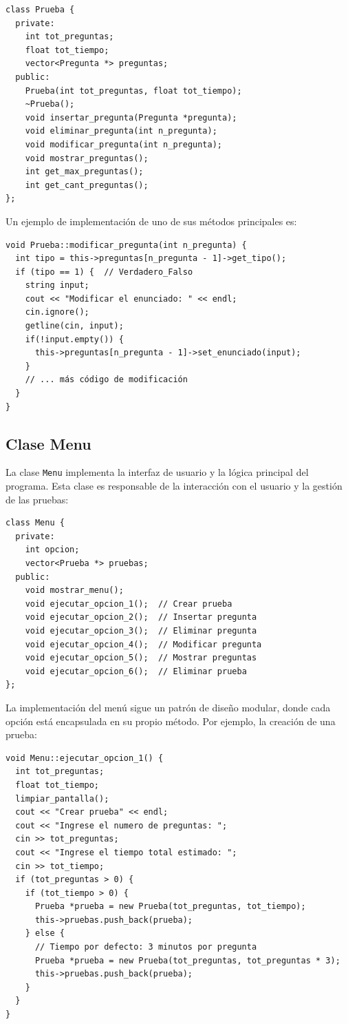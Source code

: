 \documentclass[12pt]{article}
\begin{document}
\begin{lstlisting}[style=customc]
class Prueba {
  private:
    int tot_preguntas;
    float tot_tiempo;
    vector<Pregunta *> preguntas;
  public:
    Prueba(int tot_preguntas, float tot_tiempo);
    ~Prueba();
    void insertar_pregunta(Pregunta *pregunta);
    void eliminar_pregunta(int n_pregunta);
    void modificar_pregunta(int n_pregunta);
    void mostrar_preguntas();
    int get_max_preguntas();
    int get_cant_preguntas();
};
\end{lstlisting}

Un ejemplo de implementaci\'on de uno de sus m\'etodos principales es:

\begin{lstlisting}[style=customc]
void Prueba::modificar_pregunta(int n_pregunta) {
  int tipo = this->preguntas[n_pregunta - 1]->get_tipo();
  if (tipo == 1) {  // Verdadero_Falso
    string input;
    cout << "Modificar el enunciado: " << endl;
    cin.ignore();
    getline(cin, input);
    if(!input.empty()) {
      this->preguntas[n_pregunta - 1]->set_enunciado(input);
    }
    // ... más código de modificación
  }
}
\end{lstlisting}

\subsection{Clase Menu}
La clase \texttt{Menu} implementa la interfaz de usuario y la l\'ogica principal del programa. Esta clase es responsable de la interacci\'on con el usuario y la gesti\'on de las pruebas:

\begin{lstlisting}[style=customc]
class Menu {
  private:
    int opcion;
    vector<Prueba *> pruebas;
  public:
    void mostrar_menu();
    void ejecutar_opcion_1();  // Crear prueba
    void ejecutar_opcion_2();  // Insertar pregunta
    void ejecutar_opcion_3();  // Eliminar pregunta
    void ejecutar_opcion_4();  // Modificar pregunta
    void ejecutar_opcion_5();  // Mostrar preguntas
    void ejecutar_opcion_6();  // Eliminar prueba
};
\end{lstlisting}

La implementaci\'on del men\'u sigue un patr\'on de dise\~no modular, donde cada opci\'on est\'a encapsulada en su propio m\'etodo. Por ejemplo, la creaci\'on de una prueba:

\begin{lstlisting}[style=customc]
void Menu::ejecutar_opcion_1() {  
  int tot_preguntas;
  float tot_tiempo;
  limpiar_pantalla();
  cout << "Crear prueba" << endl;
  cout << "Ingrese el numero de preguntas: ";
  cin >> tot_preguntas;
  cout << "Ingrese el tiempo total estimado: ";
  cin >> tot_tiempo;
  if (tot_preguntas > 0) {
    if (tot_tiempo > 0) {
      Prueba *prueba = new Prueba(tot_preguntas, tot_tiempo);
      this->pruebas.push_back(prueba);
    } else {
      // Tiempo por defecto: 3 minutos por pregunta
      Prueba *prueba = new Prueba(tot_preguntas, tot_preguntas * 3);
      this->pruebas.push_back(prueba);
    }
  }  
}
\end{lstlisting}
\end{document}
